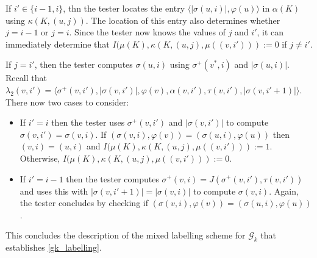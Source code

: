 \documentclass{patmorin}
\begin{document}
  If $i'\in\{i-1,i\}$, thn the tester locates the entry $\langle |\sigma(u,i)|,\varphi(u)\rangle$ in $\alpha(K)$ using $\kappa(K,(u,j))$. The location of this entry also determines whether $j=i-1$ or $j=i$.  Since the tester now knows the values of $j$ and $i'$, it can immediately determine that $I(\mu(K),\kappa(K,(u,j),\mu((v,i'))):=0$ if $j\neq i'$. 
  
  If $j=i'$, then the tester computes $\sigma(u,i)$ using $\sigma^+(v^*,i)$ and $|\sigma(u,i)|$. Recall that $\lambda_2(v,i')=\langle \sigma^+(v,i'), |\sigma(v,i')|, \varphi(v),\alpha(v,i'),\tau(v,i'),|\sigma(v,i'+1)|\rangle$.
  There now two cases to consider:
  \begin{itemize}
    \item If $i'=i$ then the tester uses $\sigma^+(v,i')$ and $|\sigma(v,i')|$ to compute $\sigma(v,i')=\sigma(v,i)$.  If $(\sigma(v,i),\varphi(v))=(\sigma(u,i),\varphi(u))$ then $(v,i)=(u,i)$ and  $I(\mu(K),\kappa(K,(u,j),\mu((v,i'))):=1$.  Otherwise, $I(\mu(K),\kappa(K,(u,j),\mu((v,i'))):=0$.

    \item If $i'=i-1$ then the tester computes $\sigma^+(v,i)=J(\sigma^+(v,i'),\tau(v,i'))$ and uses this with $|\sigma(v,i'+1)|=|\sigma(v,i)|$ to compute $\sigma(v,i)$.  Again, the tester concludes by checking if $(\sigma(v,i),\varphi(v))=(\sigma(u,i),\varphi(u))$.
  \end{itemize}
  This concludes the description of the mixed labelling scheme for $\mathcal{G}_k$ that establishes \cref{gk_labelling}.
\end{document}
